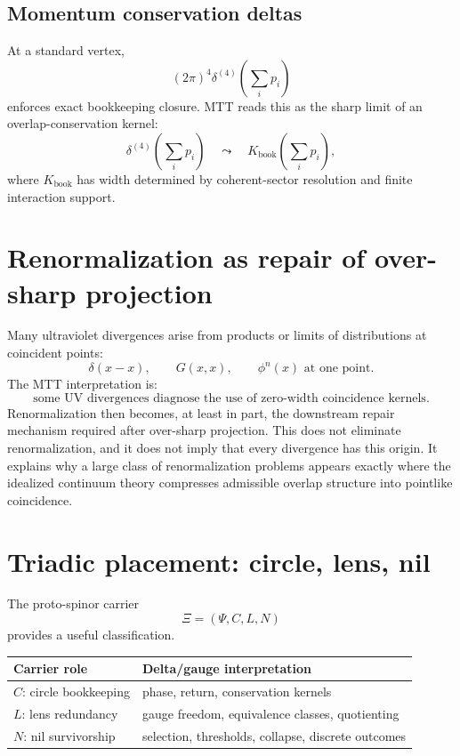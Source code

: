 \documentclass[11pt]{article}
\begin{document}
\subsection{Momentum conservation deltas}

At a standard vertex,
\begin{equation}
(2\pi)^4\delta^{(4)}\left(\sum_i p_i\right)
\end{equation}
enforces exact bookkeeping closure.  MTT reads this as the sharp limit of an
overlap-conservation kernel:
\begin{equation}
\delta^{(4)}\left(\sum_i p_i\right)
\quad\leadsto\quad
K_{\mathrm{book}}\left(\sum_i p_i\right),
\end{equation}
where \(K_{\mathrm{book}}\) has width determined by coherent-sector resolution and finite
interaction support.

\section{Renormalization as repair of over-sharp projection}

Many ultraviolet divergences arise from products or limits of distributions at coincident
points:
\begin{equation}
\delta(x-x),\qquad G(x,x),\qquad \phi^n(x)\text{ at one point}.
\end{equation}
The MTT interpretation is:
\[
\boxed{\text{some UV divergences diagnose the use of zero-width coincidence kernels}.}
\]
Renormalization then becomes, at least in part, the downstream repair mechanism required
after over-sharp projection. This does not eliminate renormalization, and it does not imply
that every divergence has this origin. It explains why a large class of renormalization
problems appears exactly where the idealized continuum theory compresses admissible
overlap structure into pointlike coincidence.

\section{Triadic placement: circle, lens, nil}

The proto-spinor carrier
\begin{equation}
\Xi=(\Psi,C,L,N)
\end{equation}
provides a useful classification.

\begin{center}
\begin{tabular}{ll}
Carrier role & Delta/gauge interpretation\\
\hline
\(C\): circle bookkeeping & phase, return, conservation kernels\\
\(L\): lens redundancy & gauge freedom, equivalence classes, quotienting\\
\(N\): nil survivorship & selection, thresholds, collapse, discrete outcomes
\end{tabular}
\end{center}
\end{document}
